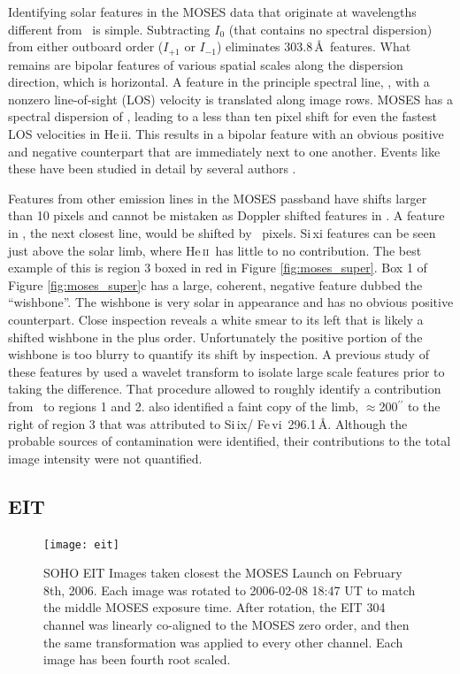 		
		Identifying solar features in the MOSES data that originate at wavelengths different from \heii\ is simple. 
		Subtracting $I_0$ (that contains no spectral dispersion) from either outboard order ($I_{+1}$ or $I_{-1}$) eliminates 303.8\,\AA\ features. 
		What remains are bipolar features of various spatial scales along the dispersion direction, which is horizontal.  
		A feature in the principle spectral line, \heii, with a nonzero line-of-sight (LOS) velocity is translated along image rows.    
		MOSES has a spectral dispersion of \spectdispersvel, leading to a less than ten pixel shift for even the fastest LOS velocities in He\,{\sc ii}. 
		This results in a bipolar feature with an obvious positive and negative counterpart that are immediately next to one another. Events like these have been studied in detail by several authors \citep{Fox2011,Courrier2018,Rust2019}.
		
		Features from other emission lines in the MOSES passband have shifts larger than 10 pixels and cannot be mistaken as Doppler shifted features in \heii. 
		A feature in \sixi, the next closest line, would be shifted by \sixipix\ pixels. 
		Si\,{\sc xi} features can be seen just above the solar limb, where He\,\textsc{ii}\ has little to no contribution. 
		The best example of this is region 3 boxed in red in Figure \ref{fig:moses_super}.  
		Box 1 of Figure \ref{fig:moses_super}c has a large, coherent, negative feature dubbed the ``wishbone''.  
		The wishbone is very solar in appearance and has no obvious positive counterpart.  
		Close inspection reveals a white smear to its left that is likely a shifted wishbone in the plus order.  
		Unfortunately the positive portion of the wishbone is too blurry to quantify its shift by inspection. 
		A previous study of these features by \citet{Rust2017} used a wavelet transform to isolate large scale features prior to taking the difference.  
		That procedure allowed \citet{Rust2017} to roughly identify a contribution from \ to regions 1 and 2.
		\citet{Rust2017} also identified a faint copy of the limb, $\approx$200$^{\prime\prime}$ to the right of region 3 that was attributed to Si\,{\sc ix}/ Fe\,{\sc vi}\ 296.1\,\AA.
		Although the probable sources of contamination were identified, their contributions to the total image intensity were not quantified.
	
	\subsection{EIT}\label{sec:EIT_data}
		\begin{figure}
			\centering
			\texttt{[image: eit]}
			\caption{SOHO EIT Images taken closest the MOSES Launch on February 8th, 2006. Each image was rotated to 2006-02-08 18:47 UT to match the middle MOSES exposure time.  After rotation, the EIT 304 channel was linearly co-aligned to the MOSES zero order, and then the same transformation was applied to every other channel.  Each image has been fourth root scaled.}
			\label{fig:EIT}
		\end{figure}
	
